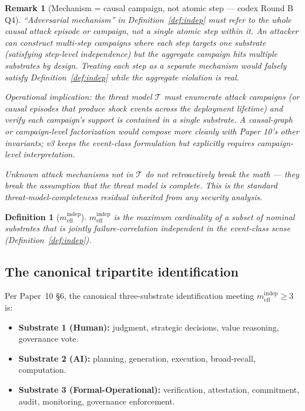 \documentclass{article}
\newtheorem{definition}{Definition}
\newtheorem{remark}{Remark}
\newcommand{\mindep}{m_{\mathrm{eff}}^{\mathrm{indep}}}
\begin{document}
\begin{remark}[Mechanism = causal campaign, not atomic step --- codex Round B Q4]
\label{rem:mechanism_campaign}
``Adversarial mechanism'' in Definition~\ref{def:indep} must refer to
the whole causal attack episode or campaign, not a single atomic step
within it.  An attacker can construct multi-step campaigns where each
step targets one substrate (satisfying step-level independence) but
the aggregate campaign hits multiple substrates by design.  Treating
each step as a separate mechanism would falsely satisfy
Definition~\ref{def:indep} while the aggregate violation is real.

Operational implication: the threat model $\mathcal{T}$ must enumerate
attack \emph{campaigns} (or causal episodes that produce shock events
across the deployment lifetime) and verify each campaign's support
is contained in a single substrate.  A causal-graph or
campaign-level factorization would compose more cleanly with Paper
10's other invariants; v3 keeps the event-class formulation but
explicitly requires campaign-level interpretation.

Unknown attack mechanisms not in $\mathcal{T}$ do not retroactively
break the math --- they break the assumption that the threat model is
complete.  This is the standard threat-model-completeness residual
inherited from any security analysis.
\end{remark}

\begin{definition}[$\mindep$]
\label{def:mindep}
$\mindep$ is the maximum cardinality of a subset of nominal substrates
that is jointly failure-correlation independent in the event-class
sense (Definition~\ref{def:indep}).
\end{definition}

\subsection{The canonical tripartite identification}
\label{sec:tripartite}

Per Paper~10 \S6, the canonical three-substrate identification meeting
$\mindep \geq 3$ is:

\begin{itemize}
\item \textbf{Substrate 1 (Human):} judgment, strategic decisions,
  value reasoning, governance vote.
\item \textbf{Substrate 2 (AI):} planning, generation, execution,
  broad-recall, computation.
\item \textbf{Substrate 3 (Formal-Operational):} verification,
  attestation, commitment, audit, monitoring, governance enforcement.
\end{itemize}
\end{document}
